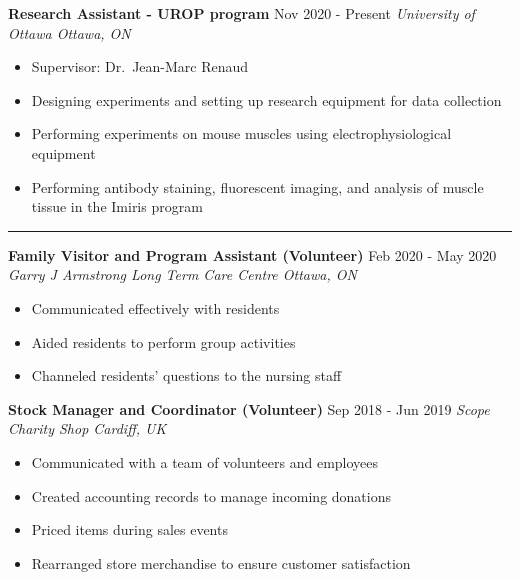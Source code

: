 \textbf{Research Assistant - UROP program} \hfill Nov 2020 - Present
\linebreak      \emph{University of Ottawa \hfill Ottawa, ON}

\begin{itemize}
\tightlist
\item
  Supervisor: Dr.~Jean-Marc Renaud
\item
  Designing experiments and setting up research equipment for data
  collection
\item
  Performing experiments on mouse muscles using electrophysiological
  equipment
\item
  Performing antibody staining, fluorescent imaging, and analysis of
  muscle tissue in the Imiris program
\end{itemize}

\vspace{1em}

 \vspace{-1em} \noindent

\rule{18cm}{0.5pt}

\textbf{Family Visitor and Program Assistant (Volunteer)} \hfill Feb
2020 - May 2020 \linebreak \emph{Garry J Armstrong Long Term Care Centre
\hfill Ottawa, ON}

\begin{itemize}
\tightlist
\item
  Communicated effectively with residents
\item
  Aided residents to perform group activities
\item
  Channeled residents' questions to the nursing staff
\end{itemize}

\textbf{Stock Manager and Coordinator (Volunteer)} \hfill Sep 2018 - Jun
2019 \linebreak \emph{Scope Charity Shop \hfill Cardiff, UK}

\begin{itemize}
\tightlist
\item
  Communicated with a team of volunteers and employees
\item
  Created accounting records to manage incoming donations
\item
  Priced items during sales events
\item
  Rearranged store merchandise to ensure customer satisfaction
\end{itemize}

